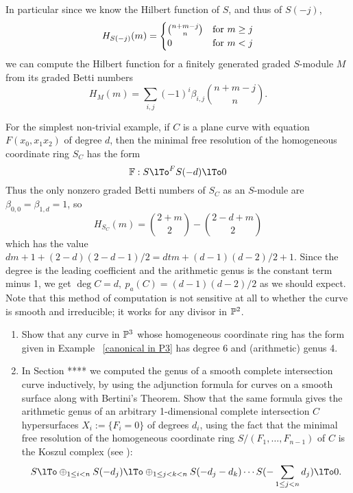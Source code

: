  In particular since we know the Hilbert function of $S$, and thus of $S(-j)$,
$$
H_{S(-j)}(m) = 
\begin{cases}
 {n+m-j \choose n} & \hbox{for $m\geq j$}
  \\ 
 0 & \hbox{for $m<j$}
\end{cases}
$$
we can compute the Hilbert function for a finitely generated graded $S$-module $M$ from its graded Betti numbers 
$$
H_{M}(m) = \sum_{i,j} (-1)^{i}\beta_{i,j}{n+m-j\choose n}.
$$
\begin{example}  
For the simplest non-trivial example, if $C$ is a plane curve with equation $F(x_{0},x_{1}x_{2})$ of 
degree $d$, then the minimal free resolution of the homogeneous coordinate ring $S_{C}$ has the form
$$
\FF: S\lTo^{F}S(-d)\lTo 0
$$
Thus the only nonzero graded Betti numbers of $S_{C}$ as an $S$-module are
 $\beta_{0,0} = \beta_{1,d} = 1$, so
$$
 H_{S_{C}}(m) = {2+m\choose 2} - {2-d+m\choose 2}
 $$
 which has the value  $dm + 1+(2-d)(2-d-1)/2 = dtm+ (d-1)(d-2)/2 +1$. Since the degree is the leading coefficient and the arithmetic genus  is the constant term minus 1, we get
$\deg C = d,\ p_{a}(C) = (d-1)(d-2)/2$ as we should expect.  Note that this method of computation is not sensitive at all to whether the curve is smooth and irreducible; it works for any divisor in ${\mathbb P}^{2}$.
\end{example}

\begin{exercise} 
\begin{enumerate}
 \item Show that any curve in ${\mathbb P}^{3}$ whose homogeneous coordinate ring has the
 form given in Example ~\ref{canonical in P3} has degree 6 and (arithmetic) genus 4.
 
\item In Section **** we computed the genus of a smooth complete intersection curve inductively, by using the adjunction formula for curves on a smooth surface along with Bertini's Theorem.
Show that the same formula gives the arithmetic genus of an arbitrary 1-dimensional complete intersection $C$ hypersurfaces 
$X_{i} := \{F_{i} = 0\}$ of degrees $d_{i}$,
using the fact that the minimal free resolution of the homogeneous coordinate ring 
$S/(F_{1}, \dots, F_{n-1})$ of $C$  is the Koszul complex (see \cite{???}):
\small
$$
 S \lTo \oplus_{1\leq i<n}S(-d_{j}) \lTo  \oplus_{1\leq j<k<n}S(-d_{j}-d_{k}) \cdots S(-\sum_{1\leq j<n}d_{j})\lTo 0.
 $$
\normalsize
\end{enumerate}
\end{exercise}

